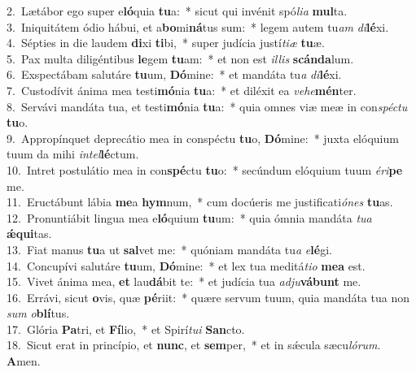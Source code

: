 {2.~}Lætábor ego super e\textbf{ló}quia \textbf{tu}a:~* sicut qui invénit spó\textit{li}\textit{a} \textbf{mul}ta.\\
{3.~}Iniquitátem ódio hábui, et a\textbf{bo}mi\textbf{ná}tus sum:~* legem autem tu\textit{am} \textit{di}\textbf{lé}xi.\\
{4.~}Sépties in die laudem \textbf{di}xi \textbf{ti}bi,~* super judícia justí\textit{ti}\textit{æ} \textbf{tu}æ.\\
{5.~}Pax multa diligéntibus \textbf{le}gem \textbf{tu}am:~* et non est \textit{il}\textit{lis} \textbf{scán}\textbf{da}lum.\\
{6.~}Exspectábam salutáre \textbf{tu}um, \textbf{Dó}mine:~* et mandáta tu\textit{a} \textit{di}\textbf{lé}xi.\\
{7.~}Custodívit ánima mea testi\textbf{mó}nia \textbf{tu}a:~* et diléxit ea \textit{ve}\textit{he}\textbf{mén}ter.\\
{8.~}Servávi mandáta tua, et testi\textbf{mó}nia \textbf{tu}a:~* quia omnes viæ meæ in con\textit{spé}\textit{ctu} \textbf{tu}o.\\
{9.~}Appropínquet deprecátio mea in conspéctu \textbf{tu}o, \textbf{Dó}mine:~* juxta elóquium tuum da mihi \textit{in}\textit{tel}\textbf{lé}ctum.\\
{10.~}Intret postulátio mea in con\textbf{spé}ctu \textbf{tu}o:~* secúndum elóquium tuum \textit{é}\textit{ri}\textbf{pe} me.\\
{11.~}Eructábunt lábia \textbf{me}a \textbf{hym}num,~* cum docúeris me justificati\textit{ó}\textit{nes} \textbf{tu}as.\\
{12.~}Pronuntiábit lingua mea e\textbf{ló}quium \textbf{tu}um:~* quia ómnia mandáta \textit{tu}\textit{a} \textbf{ǽ}\textbf{qui}tas.\\
{13.~}Fiat manus \textbf{tu}a ut \textbf{sal}vet me:~* quóniam mandáta tu\textit{a} \textit{e}\textbf{lé}gi.\\
{14.~}Concupívi salutáre \textbf{tu}um, \textbf{Dó}mine:~* et lex tua meditá\textit{ti}\textit{o} \textbf{me}\textbf{a} est.\\
{15.~}Vivet ánima mea, \textbf{et} lau\textbf{dá}bit te:~* et judícia tua \textit{ad}\textit{ju}\textbf{vá}\textbf{bunt} me.\\
{16.~}Errávi, sicut \textbf{o}vis, quæ \textbf{pé}riit:~* quære servum tuum, quia mandáta tua non \textit{sum} \textit{o}\textbf{blí}tus.\\
{17.~}Glória \textbf{Pa}tri, et \textbf{Fí}lio,~* et Spirí\textit{tu}\textit{i} \textbf{San}cto.\\
{18.~}Sicut erat in princípio, et \textbf{nunc}, et \textbf{sem}per,~* et in sǽcula sæcu\textit{ló}\textit{rum}. \textbf{A}men.\\

